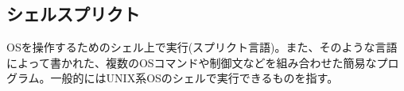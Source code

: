 \subsection{シェルスプリクト}
OSを操作するためのシェル上で実行(スプリクト言語)。また、そのような言語によって書かれた、複数のOSコマンドや制御文などを組み合わせた簡易なプログラム。一般的にはUNIX系OSのシェルで実行できるものを指す。



























